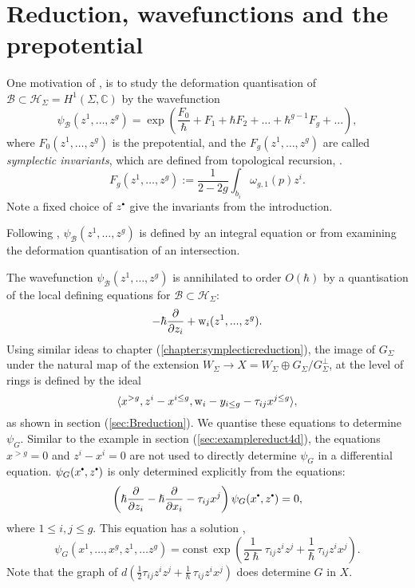     
    
    \section{Reduction, wavefunctions and the prepotential}
    
    One motivation of \cite{ks_airy}, is to study the deformation quantisation of \( \mathcal{B} \subset \mathcal{H}_\Sigma = H^1(\Sigma, \mathbb{C}) \) by the wavefunction
    \[\psi_{\mathcal{B}}(z^1, \dots , z^g) = \exp\left(\frac{F_0}{\hbar}+F_1+\hbar F_2+\dots +\hbar^{g-1}F_g+\dots\right),
    \]
    where \(F_0(z^1, \dots , z^g)\) is the prepotential, and the \(F_g(z^1, \dots , z^g)\) are called \emph{symplectic invariants}, which are defined from topological recursion, \cite{chaimanowong2020airy}. 
    \[  F_g(z^1, \dots , z^g) :=\frac{1}{2-2g}\int_{b_i}\omega_{g,1}(p) z^i. \]
    Note a fixed choice of \(z^{\sbt}\) give the invariants from the introduction.
    
    Following \cite{ks_airy},  \(\psi_{\mathcal{B}}(z^1, \dots, z^g)\) is defined by an integral equation or from examining the deformation quantisation of an intersection.
    
    The wavefunction \( \psi_{\mathcal{B}}(z^1, \dots, z^g)\) is annihilated to order \( O(\hbar)\) by a quantisation of the local defining equations for \( \mathcal{B} \subset \mathcal{H}_\Sigma \):
    \[ -\hbar\frac{\partial}{\partial z_i}+\mathrm{w}_i(z^1,...,z^g).\] 
    Using similar ideas to chapter (\ref{chapter:symplecticreduction}), the image of \(G_\Sigma\) under the natural map of the extension \(W_\Sigma \rightarrow X =  W_\Sigma \oplus G_\Sigma / G_\Sigma^{\perp}\), at the level of rings is defined by the ideal
    \[    \langle x^{>g}, z^i - x^{i \leq g}, \mathrm{w}_i - y_{i\leq g}-\tau_{ij}x^{j \leq g} \rangle, \]
    as shown in section (\ref{sec:Breduction}). We quantise these equations to determine \( \psi_G\). Similar to the example in section (\ref{sec:examplereduct4d}), the equations \(x^{>g}=0\) and \(z^i - x^i=0\) are not used to directly determine \( \psi_G\) in a differential equation. \(\psi_G(x^{\sbt},z^{\sbt})\) is only determined explicitly from the equations:
    \[\left( \hslash \frac{\partial}{\partial z_i} - \hslash \frac{\partial}{\partial x_i } - \tau_{ij} x^j \right) \psi_G(x^{\sbt},z^{\sbt}) = 0, \]
    where \( 1 \leq i, j \leq g\). This equation has a solution 
,    \[ \psi_G(x^1, \dots ,x^g, z^1,\dots z^g ) = \mathrm{const} \, \exp\left( \frac{1}{2 \hslash}\, \tau_{ij} z^i z^j +  \frac{1}{\hslash} \, \tau_{ij} z^i x^j  \right). \]
    Note that the graph of \( d \left( \frac{1}{2} \tau_{ij} z^i z^j +  \frac{1}{\hslash} \, \tau_{ij} z^i x^j \right)\) does determine \(G\) in \(X\). 

